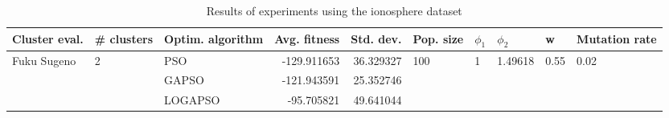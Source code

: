 \begin{table}
\centering
\caption{Results of experiments using the ionosphere dataset}
\begin{tabular}{lllrrlllll}
\toprule
               Cluster eval. &        \# clusters & Optim. algorithm &  Avg. fitness &  Std. dev. &            Pop. size &         $\phi_{1}$ &               $\phi_{2}$ &                     w &         Mutation rate \\
\midrule
\multirow{3}{*}{Fuku Sugeno} & \multirow{3}{*}{2} &              PSO &   -129.911653 &  36.329327 & \multirow{3}{*}{100} & \multirow{3}{*}{1} & \multirow{3}{*}{1.49618} & \multirow{3}{*}{0.55} & \multirow{3}{*}{0.02} \\
                             &                    &            GAPSO &   -121.943591 &  25.352746 &                      &                    &                          &                       &                       \\
                             &                    &          LOGAPSO &    -95.705821 &  49.641044 &                      &                    &                          &                       &                       \\
\bottomrule
\end{tabular}
\end{table}
